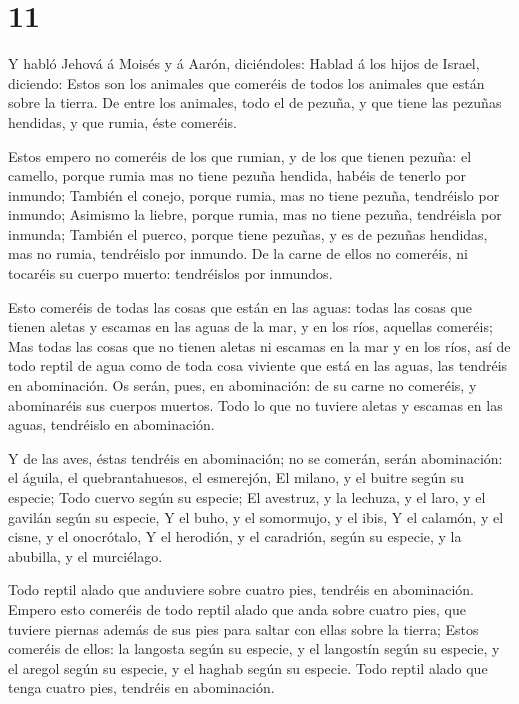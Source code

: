 \hypertarget{section-10}{%
\section{11}\label{section-10}}

 Y habló Jehová á Moisés y á Aarón, diciéndoles:
 Hablad á los hijos de Israel, diciendo: Estos son los
animales que comeréis de todos los animales que están sobre la tierra.
 De entre los animales, todo el de pezuña, y que tiene las
pezuñas hendidas, y que rumia, éste comeréis.

 Estos empero no comeréis de los que rumian, y de los que
tienen pezuña: el camello, porque rumia mas no tiene pezuña hendida,
habéis de tenerlo por inmundo;  También el conejo, porque
rumia, mas no tiene pezuña, tendréislo por inmundo; 
Asimismo la liebre, porque rumia, mas no tiene pezuña, tendréisla por
inmunda;  También el puerco, porque tiene pezuñas, y es de
pezuñas hendidas, mas no rumia, tendréislo por inmundo. 
De la carne de ellos no comeréis, ni tocaréis su cuerpo muerto:
tendréislos por inmundos.

 Esto comeréis de todas las cosas que están en las aguas:
todas las cosas que tienen aletas y escamas en las aguas de la mar, y en
los ríos, aquellas comeréis;  Mas todas las cosas que no
tienen aletas ni escamas en la mar y en los ríos, así de todo reptil de
agua como de toda cosa viviente que está en las aguas, las tendréis en
abominación.  Os serán, pues, en abominación: de su carne
no comeréis, y abominaréis sus cuerpos muertos.  Todo lo
que no tuviere aletas y escamas en las aguas, tendréislo en abominación.

 Y de las aves, éstas tendréis en abominación; no se
comerán, serán abominación: el águila, el quebrantahuesos, el esmerejón,
 El milano, y el buitre según su especie; 
Todo cuervo según su especie;  El avestruz, y la lechuza,
y el laro, y el gavilán según su especie,  Y el buho, y
el somormujo, y el ibis,  Y el calamón, y el cisne, y el
onocrótalo,  Y el herodión, y el caradrión, según su
especie, y la abubilla, y el murciélago.

 Todo reptil alado que anduviere sobre cuatro pies,
tendréis en abominación.  Empero esto comeréis de todo
reptil alado que anda sobre cuatro pies, que tuviere piernas además de
sus pies para saltar con ellas sobre la tierra;  Estos
comeréis de ellos: la langosta según su especie, y el langostín según su
especie, y el aregol según su especie, y el haghab según su especie.
 Todo reptil alado que tenga cuatro pies, tendréis en
abominación.

